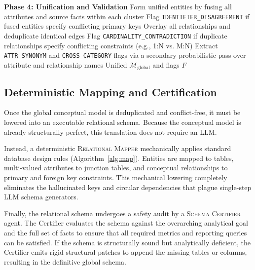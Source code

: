 \begin{algorithm}[t]
\begin{algorithmic}[1]
  \State \textbf{Phase 4: Unification and Validation}
  \State Form unified entities by fusing all attributes and source facts within each cluster
  \State Flag \texttt{IDENTIFIER\_DISAGREEMENT} if fused entities specify conflicting primary keys
  \State Overlay all relationships and deduplicate identical edges
  \State Flag \texttt{CARDINALITY\_CONTRADICTION} if duplicate relationships specify conflicting constraints (e.g., 1:N vs. M:N)
  \State Extract \texttt{ATTR\_SYNONYM} and \texttt{CROSS\_CATEGORY} flags via a secondary probabilistic pass over attribute and relationship names
  \State \Return Unified $\mathcal{M}_{\text{global}}$ and flags $F$
\end{algorithmic}
\end{algorithm}

\subsection{Deterministic Mapping and Certification}
\label{subsec:relational-mapping}

Once the global conceptual model is deduplicated and conflict-free, it must be lowered into an executable relational schema. Because the conceptual model is already structurally perfect, this translation does not require an LLM.

Instead, a deterministic \textsc{Relational Mapper} mechanically applies standard database design rules (Algorithm~\ref{alg:map}). Entities are mapped to tables, multi-valued attributes to junction tables, and conceptual relationships to primary and foreign key constraints. This mechanical lowering completely eliminates the hallucinated keys and circular dependencies that plague single-step LLM schema generators.

Finally, the relational schema undergoes a safety audit by a \textsc{Schema Certifier} agent. The Certifier evaluates the schema against the overarching analytical goal and the full set of facts to ensure that all required metrics and reporting queries can be satisfied. If the schema is structurally sound but analytically deficient, the Certifier emits rigid structural patches to append the missing tables or columns, resulting in the definitive global schema.

